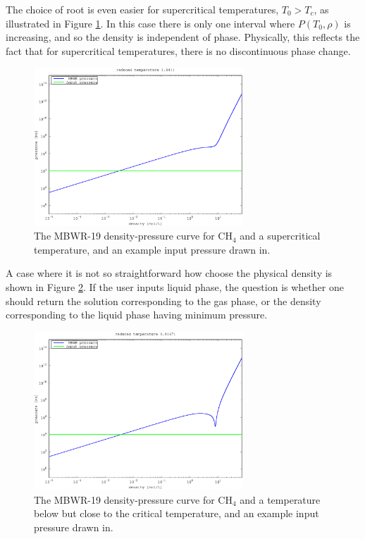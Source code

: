 \documentclass[internal,english]{sintefmemo2012}
\numberwithin{equation}{section}
\begin{document}
The choice of root is even easier for supercritical temperatures, $T_0
> T_c$, as illustrated in Figure \ref{fig:p_ill_sup}. In this
case there is only one interval where $P(T_0,\rho)$ is increasing, and
so the density is independent of phase. Physically, this reflects the
fact that for supercritical temperatures, there is no discontinuous
phase change.

\begin{figure}[h]
  \centering
  \includegraphics[width=0.7\textwidth]{figures/pressureIllustrationSupercritical.eps}
  \caption{The MBWR-19 density-pressure curve for CH$_4$ and a supercritical temperature, and
    an example input pressure drawn in.}
  \label{fig:p_ill_sup}
\end{figure}

A case where it is not so straightforward how choose the physical
density is shown in Figure \ref{fig:p_ill_meta}. If the user inputs liquid
phase, the question is whether one should return the solution
corresponding to the gas phase, or the density corresponding to the
liquid phase having minimum pressure.

\begin{figure}[h]
  \centering
  \includegraphics[width=0.7\textwidth]{figures/pressureIllustrationMeta.eps}
  \caption{The MBWR-19 density-pressure curve for CH$_4$ and a
    temperature below but close to the critical temperature, and an example input pressure drawn in.}
  \label{fig:p_ill_meta}
\end{figure}
\end{document}
